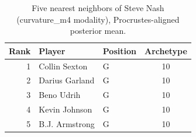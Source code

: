 \begin{table}[htbp]
  \centering\small
  \begin{tabular}{rllc}
    \toprule
    Rank & Player & Position & Archetype \\
    \midrule
    1 & Collin Sexton & G & 10 \\
    2 & Darius Garland & G & 10 \\
    3 & Beno Udrih & G & 10 \\
    4 & Kevin Johnson & G & 10 \\
    5 & B.J. Armstrong & G & 10 \\
    \bottomrule
  \end{tabular}
  \caption{Five nearest neighbors of Steve Nash (curvature_m4 modality), Procrustes-aligned posterior mean.}
  \label{tab:Steve_Nash_neighbors_curvature_m4}
\end{table}

